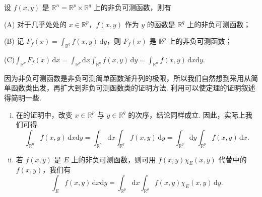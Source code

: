 \documentclass[../../main.tex]{subfiles}%
\begin{document}
\begin{theorem}\label{theorem:Tonelli定理(非负可测函数的情形)}
设 \( f(x, y) \) 是 \( \mathbb{R}^n = \mathbb{R}^p \times \mathbb{R}^q \) 上的非负可测函数，则有

(A) 对于几乎处处的 \( x \in \mathbb{R}^p \)，\( f(x, y) \) 作为 \( y \) 的函数是 \( \mathbb{R}^q \) 上的非负可测函数；

(B) 记 \( F_f(x) = \int_{\mathbb{R}^q} f(x, y) \, \mathrm{d}y \)，则 \( F_f(x) \) 是 \( \mathbb{R}^p \) 上的非负可测函数；

(C)$\int_{\mathbb{R}^p} F_f(x) \, \mathrm{d}x = \int_{\mathbb{R}^p} \mathrm{d}x \int_{\mathbb{R}^q} f(x, y) \, \mathrm{d}y = \int_{\mathbb{R}^n} f(x, y) \, \mathrm{d}x\mathrm{d}y.$
\end{theorem}
\begin{note}
因为非负可测函数是非负可测简单函数渐升列的极限，所以我们自然想到采用从简单函数类出发，再扩大到非负可测函数类的证明方法. 利用可以使定理的证明叙述得简明一些. 
\end{note}
\begin{remark}
\begin{enumerate}[(i)]
\item 在的证明中，改变 \( x \in \mathbb{R}^p \) 与 \( y \in \mathbb{R}^q \) 的次序，结论同样成立. 因此，实际上我们可得
\[
\int_{\mathbb{R}^n} f(x, y) \, \mathrm{d}x\mathrm{d}y = \int_{\mathbb{R}^p} \mathrm{d}x \int_{\mathbb{R}^q} f(x, y) \, \mathrm{d}y = \int_{\mathbb{R}^q} \mathrm{d}y \int_{\mathbb{R}^p} f(x, y) \, \mathrm{d}x.
\]

\item 若 \( f(x, y) \) 是 \( E \) 上的非负可测函数，则可用 \( f(x, y) \chi_E(x, y) \) 代替中的 \( f(x, y) \)，我们有
\[
\int_E f(x, y) \, \mathrm{d}x\mathrm{d}y = \int_{\mathbb{R}^p} \mathrm{d}x \int_{\mathbb{R}^q} f(x, y) \chi_E(x, y) \, \mathrm{d}y.
\]
\end{enumerate}
\end{remark}
\end{document}
